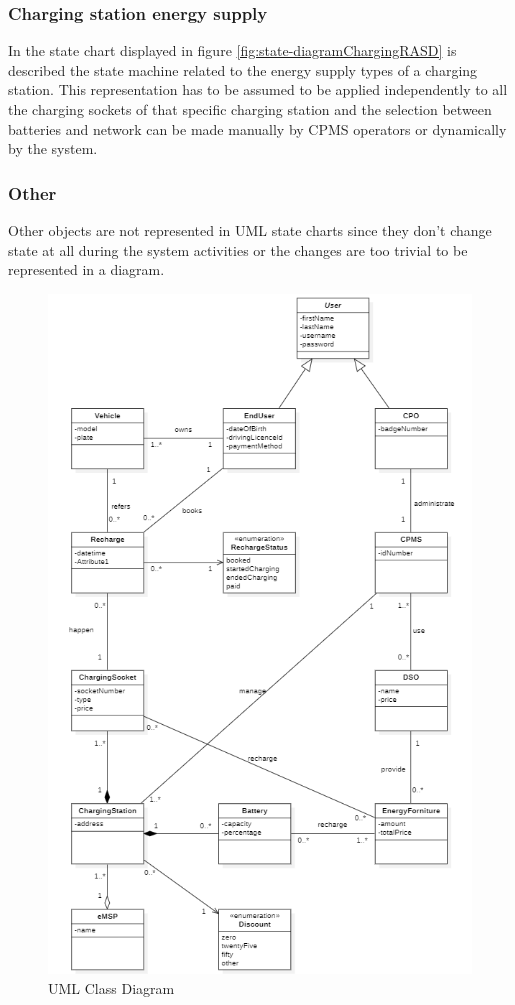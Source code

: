 \documentclass[a4paper]{report}
\begin{document}
\subsubsection{Charging station energy supply}
In the state chart displayed in figure \ref{fig:state-diagramChargingRASD} is described the state machine related to the energy supply types of a charging station. This representation has to be assumed to be applied independently to all the charging sockets of that specific charging station and the selection between batteries and network can be made manually by CPMS operators or dynamically by the system.

\subsubsection{Other}
Other objects are not represented in UML state charts since they don't change state at all during the system activities or the changes are too trivial to be represented in a diagram.

\begin{figure}[p]
\includegraphics[width=\textwidth]{ClassDiagramRASD}
\caption{UML Class Diagram}
\label{fig:class-diagramRASD}
\end{figure}
\restoregeometry
\end{document}
